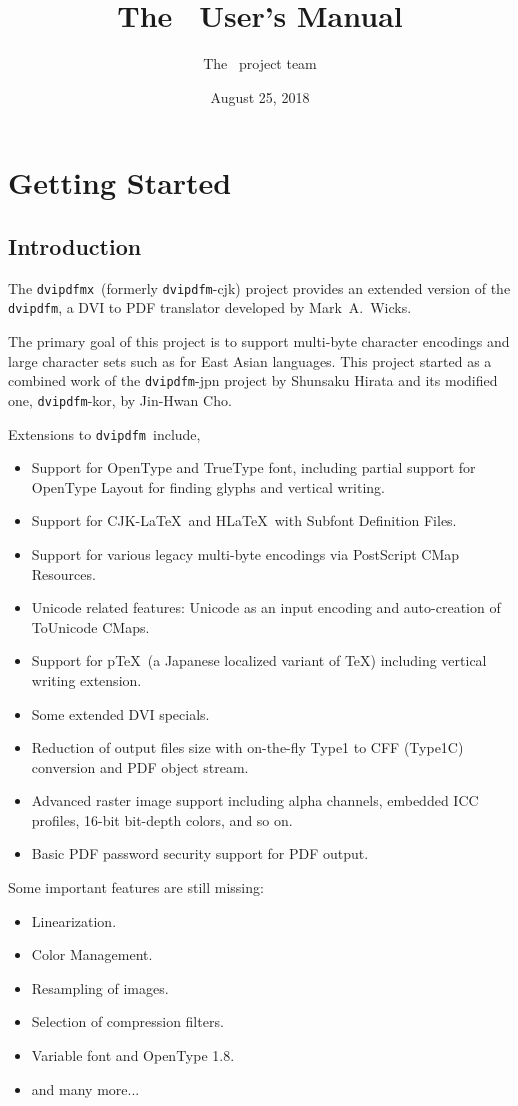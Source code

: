 \documentclass[a4paper,xetex,oneside]{book}
\title{The \dvipdfmx\ User's Manual}
\author{The \dvipdfmx\ project team}
\date{August 25, 2018}
\newcommand{\dvipdfm}{\texttt{dvipdfm}}
\newcommand{\dvipdfmx}{\texttt{dvipdfmx}}
\begin{document}
\maketitle
\tableofcontents

\chapter{Getting Started}

\section{Introduction}

The \dvipdfmx\ (formerly \dvipdfm-cjk) project provides an extended version of
the \dvipdfm, a DVI to PDF translator developed by Mark~A.~Wicks.

The primary goal of this project is to support multi-byte character encodings
and large character sets such as for East Asian languages.
This project started as a combined work of the \dvipdfm-jpn project by
Shunsaku Hirata and its modified one, \dvipdfm-kor, by Jin-Hwan Cho.

Extensions to \dvipdfm\ include,
\begin{itemize}
    \item Support for OpenType and TrueType font, including partial support
    for OpenType Layout for finding glyphs and vertical writing.
    \item Support for CJK-\LaTeX\ and H\LaTeX\ with Subfont Definition Files.
    \item Support for various legacy multi-byte encodings via PostScript CMap
     Resources.
    \item Unicode related features: Unicode as an input encoding and
    auto-creation of ToUnicode CMaps.
    \item Support for p\TeX\ (a Japanese localized variant of \TeX) including
    vertical writing extension.
    \item Some extended DVI specials.
    \item Reduction of output files size with on-the-fly Type1 to CFF (Type1C)
    conversion and PDF object stream.
    \item Advanced raster image support including alpha channels, embedded
    ICC profiles, 16-bit bit-depth colors, and so on.
    \item Basic PDF password security support for PDF output.
\end{itemize}
Some important features are still missing:
\begin{itemize}
    \item Linearization.
    \item Color Management.
    \item Resampling of images.
    \item Selection of compression filters.
    \item Variable font and OpenType 1.8.
    \item and many more...
\end{itemize}
\end{document}
